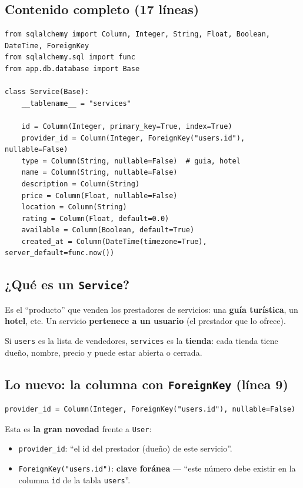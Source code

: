 \documentclass[11pt,a4paper]{article}
\begin{document}
\subsection{Contenido completo (17 líneas)}

\begin{lstlisting}
from sqlalchemy import Column, Integer, String, Float, Boolean, DateTime, ForeignKey
from sqlalchemy.sql import func
from app.db.database import Base

class Service(Base):
    __tablename__ = "services"

    id = Column(Integer, primary_key=True, index=True)
    provider_id = Column(Integer, ForeignKey("users.id"), nullable=False)
    type = Column(String, nullable=False)  # guia, hotel
    name = Column(String, nullable=False)
    description = Column(String)
    price = Column(Float, nullable=False)
    location = Column(String)
    rating = Column(Float, default=0.0)
    available = Column(Boolean, default=True)
    created_at = Column(DateTime(timezone=True), server_default=func.now())
\end{lstlisting}

\subsection{¿Qué es un \texttt{Service}?}

Es el ``producto'' que venden los prestadores de servicios: una \textbf{guía turística},
un \textbf{hotel}, etc. Un servicio \textbf{pertenece a un usuario} (el prestador que lo ofrece).

\begin{analogia}
Si \texttt{users} es la lista de vendedores, \texttt{services} es la \textbf{tienda}:
cada tienda tiene dueño, nombre, precio y puede estar abierta o cerrada.
\end{analogia}

\subsection{Lo nuevo: la columna con \texttt{ForeignKey} (línea 9)}

\begin{lstlisting}
provider_id = Column(Integer, ForeignKey("users.id"), nullable=False)
\end{lstlisting}

Esta es \textbf{la gran novedad} frente a \texttt{User}:

\begin{itemize}
    \item \texttt{provider\_id}: ``el id del prestador (dueño) de este servicio''.
    \item \texttt{ForeignKey("users.id")}: \textbf{clave foránea} --- ``este número debe existir
    en la columna \texttt{id} de la tabla \texttt{users}''.
\end{itemize}
\end{document}
